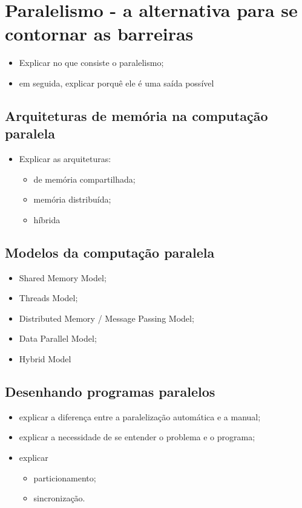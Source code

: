 \section{Paralelismo - a alternativa para se contornar as barreiras}

    \begin{itemize}
        \item Explicar no que consiste o paralelismo;
        \item em seguida, explicar porquê ele é uma saída possível
    \end{itemize}
    
    \subsection{Arquiteturas de memória na computação paralela}
    
        \begin{itemize}
            \item Explicar as arquiteturas:
            \begin{itemize}
                \item de memória compartilhada;
                \item memória distribuída;
                \item híbrida
            \end{itemize}
        \end{itemize}
    
    \subsection{Modelos da computação paralela}
    
        \begin{itemize}
            \item Shared Memory Model;
            \item Threads Model;
            \item Distributed Memory / Message Passing Model;
            \item Data Parallel Model;
            \item Hybrid Model
        \end{itemize}
    
    \subsection{Desenhando programas paralelos}
    
        \begin{itemize}
            \item explicar a diferença entre a paralelização automática e a 
            manual;
            \item explicar a necessidade de se entender o problema e o programa;
            \item explicar
            \begin{itemize}
            	\item particionamento;
            	\item sincronização.
            \end{itemize}
        \end{itemize}
